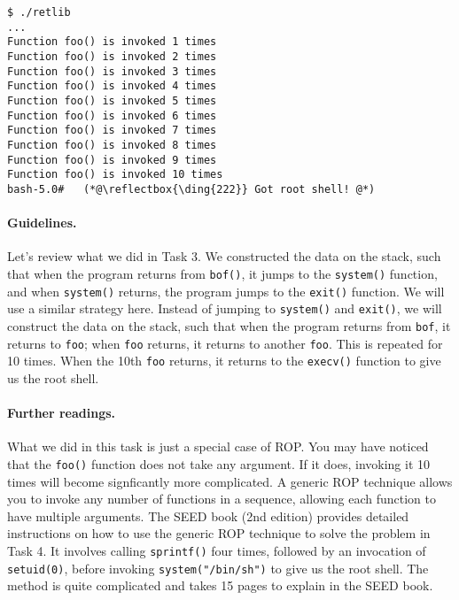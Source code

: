 \begin{lstlisting}
$ ./retlib
...
Function foo() is invoked 1 times
Function foo() is invoked 2 times
Function foo() is invoked 3 times
Function foo() is invoked 4 times
Function foo() is invoked 5 times
Function foo() is invoked 6 times
Function foo() is invoked 7 times
Function foo() is invoked 8 times
Function foo() is invoked 9 times
Function foo() is invoked 10 times
bash-5.0#   (*@\reflectbox{\ding{222}} Got root shell! @*)
\end{lstlisting}
 
\paragraph{Guidelines.} Let's review what we did in Task 3. We constructed the 
data on the stack, such that when the program returns 
from \texttt{bof()}, it jumps to the \texttt{system()} function, and 
when \texttt{system()} returns, the program jumps to the \texttt{exit()} function.  
We will use a similar strategy here. Instead of jumping to \texttt{system()} 
and \texttt{exit()}, we will construct the data on the stack, such that
when the program returns from \texttt{bof}, it returns  
to \texttt{foo}; when \texttt{foo} returns, it returns to another \texttt{foo}.
This is repeated for 10 times. When the 10th \texttt{foo} returns, it returns 
to the \texttt{execv()} function to give us the root shell.  



\paragraph{Further readings.} What we did in this task is just a special case of ROP.
You may have noticed that the \texttt{foo()} function does not take any
argument. If it does, invoking it 10 times will become signficantly more 
complicated. A generic ROP technique allows you to invoke any number of functions
in a sequence, allowing each function to have multiple arguments. 
The SEED book (2nd edition) provides detailed instructions on how to 
use the generic ROP technique to solve the problem in Task 4. It involves 
calling \texttt{sprintf()} four times, followed by an invocation of 
\texttt{setuid(0)}, before invoking \texttt{system("/bin/sh")} to give 
us the root shell. The method is quite complicated and takes 15 pages 
to explain in the SEED book.



